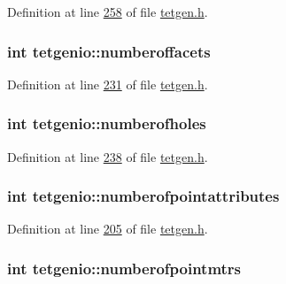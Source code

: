Definition at line \hyperlink{tetgen_8h_source_l00258}{258} of file \hyperlink{tetgen_8h_source}{tetgen.\+h}.

\subsubsection[{\texorpdfstring{numberoffacets}{numberoffacets}}]{\setlength{\rightskip}{0pt plus 5cm}int tetgenio\+::numberoffacets}\hypertarget{classtetgenio_af1cb1515751c9cd0497abba62da8790d}{}\label{classtetgenio_af1cb1515751c9cd0497abba62da8790d}


Definition at line \hyperlink{tetgen_8h_source_l00231}{231} of file \hyperlink{tetgen_8h_source}{tetgen.\+h}.

\subsubsection[{\texorpdfstring{numberofholes}{numberofholes}}]{\setlength{\rightskip}{0pt plus 5cm}int tetgenio\+::numberofholes}\hypertarget{classtetgenio_ad12a46036cd44a7a646228d5471b51ac}{}\label{classtetgenio_ad12a46036cd44a7a646228d5471b51ac}


Definition at line \hyperlink{tetgen_8h_source_l00238}{238} of file \hyperlink{tetgen_8h_source}{tetgen.\+h}.

\subsubsection[{\texorpdfstring{numberofpointattributes}{numberofpointattributes}}]{\setlength{\rightskip}{0pt plus 5cm}int tetgenio\+::numberofpointattributes}\hypertarget{classtetgenio_a3d263e577de1fa81296abe9a6ba029b0}{}\label{classtetgenio_a3d263e577de1fa81296abe9a6ba029b0}


Definition at line \hyperlink{tetgen_8h_source_l00205}{205} of file \hyperlink{tetgen_8h_source}{tetgen.\+h}.

\subsubsection[{\texorpdfstring{numberofpointmtrs}{numberofpointmtrs}}]{\setlength{\rightskip}{0pt plus 5cm}int tetgenio\+::numberofpointmtrs}\hypertarget{classtetgenio_a1a62cf8c03758eb3e1920c6c506c1a64}{}\label{classtetgenio_a1a62cf8c03758eb3e1920c6c506c1a64}


